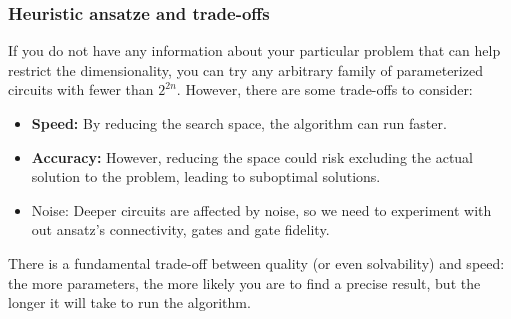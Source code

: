 \documentclass[12pt, oneside]{book}
\theoremstyle{definition}
\theoremstyle{definition}
\theoremstyle{remark}
\begin{document}
\subsubsection{Heuristic ansatze and trade-offs}
If you do not have any information about your particular problem that can help restrict the dimensionality, you can try any arbitrary family of parameterized circuits with fewer than $2^{2n}$. However, there are some trade-offs to consider:
\begin{itemize}
    \item \textbf{Speed: } By reducing the search space, the algorithm can run faster.
    \item \textbf{Accuracy: } However, reducing the space could risk excluding the actual solution to the problem, leading to suboptimal solutions.
    \item Noise: Deeper circuits are affected by noise, so we need to experiment with out ansatz's connectivity, gates and gate fidelity.
\end{itemize}
There is a fundamental trade-off between quality (or even solvability) and speed: the more parameters, the more likely you are to find a precise result, but the longer it will take to run the algorithm.
\end{document}
